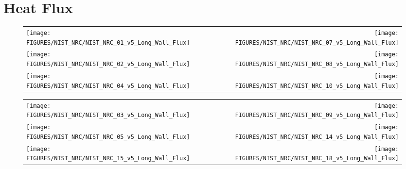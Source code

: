 \chapter{Heat Flux}


\begin{figure}[h!]
\begin{tabular*}{\textwidth}{l@{\extracolsep{\fill}}r}
\texttt{[image: FIGURES/NIST\_NRC/NIST\_NRC\_01\_v5\_Long\_Wall\_Flux]} &
\texttt{[image: FIGURES/NIST\_NRC/NIST\_NRC\_07\_v5\_Long\_Wall\_Flux]} \\
\texttt{[image: FIGURES/NIST\_NRC/NIST\_NRC\_02\_v5\_Long\_Wall\_Flux]} &
\texttt{[image: FIGURES/NIST\_NRC/NIST\_NRC\_08\_v5\_Long\_Wall\_Flux]} \\
\texttt{[image: FIGURES/NIST\_NRC/NIST\_NRC\_04\_v5\_Long\_Wall\_Flux]} &
\texttt{[image: FIGURES/NIST\_NRC/NIST\_NRC\_10\_v5\_Long\_Wall\_Flux]} \\
\end{tabular*}
\label{NIST_NRC_Long_Wall_Flux_Closed}
\end{figure}

\begin{figure}[h!]
\begin{tabular*}{\textwidth}{l@{\extracolsep{\fill}}r}
\texttt{[image: FIGURES/NIST\_NRC/NIST\_NRC\_03\_v5\_Long\_Wall\_Flux]} &
\texttt{[image: FIGURES/NIST\_NRC/NIST\_NRC\_09\_v5\_Long\_Wall\_Flux]} \\
\texttt{[image: FIGURES/NIST\_NRC/NIST\_NRC\_05\_v5\_Long\_Wall\_Flux]} &
\texttt{[image: FIGURES/NIST\_NRC/NIST\_NRC\_14\_v5\_Long\_Wall\_Flux]} \\
\texttt{[image: FIGURES/NIST\_NRC/NIST\_NRC\_15\_v5\_Long\_Wall\_Flux]} &
\texttt{[image: FIGURES/NIST\_NRC/NIST\_NRC\_18\_v5\_Long\_Wall\_Flux]}
\end{tabular*}
\label{NIST_NRC_Long_Wall_Flux_Open}
\end{figure}

\clearpage


